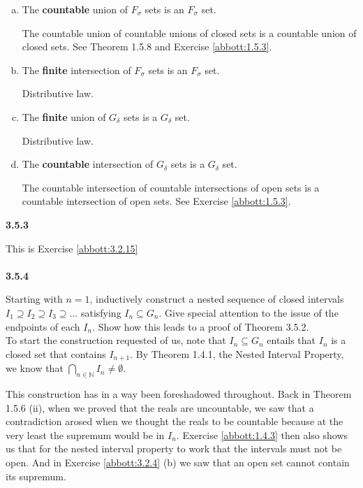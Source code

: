 \begin{enumerate}[(a)]
\item The \textbf{countable} union of $F_\sigma$ sets is an $F_\sigma$ set.

The countable union of countable unions of closed sets is a countable union of closed sets.
See Theorem 1.5.8 and Exercise \ref{abbott:1.5.3}.

\item The \textbf{finite} intersection of $F_\sigma$ sets is an $F_\sigma$ set.

Distributive law.

\item The \textbf{finite} union of $G_\delta$ sets is a $G_\delta$ set.

Distributive law.

\item The \textbf{countable} intersection of $G_\delta$ sets is a $G_\delta$ set.

The countable intersection of countable intersections of open sets is a countable intersection of open sets.
See Exercise \ref{abbott:1.5.3}.

\end{enumerate}


\textbf{3.5.3}

This is Exercise \ref{abbott:3.2.15}
\\~\\



\label{abbott:3.5.4}
\textbf{3.5.4}

Starting with $n=1$,
inductively construct a nested sequence of closed intervals $I_1 \supseteq I_2 \supseteq I_3 \supseteq \ldots$
satisfying $I_n \subseteq G_n$.
Give special attention to the issue of the endpoints of each $I_n$.
Show how this leads to a proof of Theorem 3.5.2.
\\

To start the construction requested of us, note that $I_n \subseteq G_n$
entails that $I_n$ is a closed set that contains $I_{n+1}$.
By Theorem 1.4.1, the Nested Interval Property, we know that $\bigcap_{n\in\mathbb{N}} I_n \neq \emptyset$.

This construction has in a way been foreshadowed throughout.
Back in Theorem 1.5.6 (ii), when we proved that the reals are uncountable, we saw that a contradiction arosed
when we thought the reals to be countable because at the very least the supremum would be in $I_n$.
Exercise \ref{abbott:1.4.3} then also shows us that for the nested interval property to work
that the intervals must not be open.
And in Exercise \ref{abbott:3.2.4} (b) we saw that an open set cannot contain its supremum.

